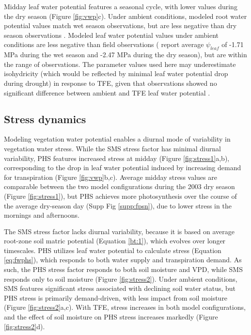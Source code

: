 \documentclass[draft,linenumbers]{agujournal}
\begin{document}
    Midday leaf water potential features a seasonal cycle, with lower values during the dry season (Figure \ref{fig:vwp}c).
    Under ambient conditions, modeled root water potential values match wet season observations, but are less negative than dry season observations \citep{fisher2006}.
    Modeled leaf water potential values under ambient conditions are less negative than field observations (\cite{fisher2006} report average $\psi_{leaf}$ of -1.71 MPa during the wet season and -2.47 MPa during the dry season), 
    but are within the range of observations.
    The parameter values used here may underestimate isohydricity (which would be reflected by minimal leaf water potential drop during drought) in response to TFE, given that observations showed no significant difference between ambient and TFE leaf water potential \citep{fisher2006}. 

\subsection{Stress dynamics}
    
    Modeling vegetation water potential enables a diurnal mode of variability in vegetation water stress.
    While the SMS stress factor has minimal diurnal variability,
    PHS features increased stress at midday (Figure \ref{fig:stress1}a,b), corresponding to the drop in leaf water potential induced by increasing demand for transpiration (Figure \ref{fig:vwp}b,c).
    Average midday stress values are comparable between the two model configurations during the 2003 dry season (Figure \ref{fig:stress1}), 
    but PHS achieves more photosynthesis over the course of the average dry-season day (Supp Fig \ref{supp:fpsn}), due to lower stress in the mornings and afternoons.
    
    The SMS stress factor lacks diurnal variability, because it is based on average root-zone soil matric potential (Equation \ref{bt:1}), which evolves over longer timescales.
    PHS utilizes leaf water potential to calculate stress (Equation \ref{eq:fwphs}), which responds to both water supply and transpiration demand.
    As such, the PHS stress factor responds to both soil moisture and VPD, while SMS responds only to soil moisture (Figure \ref{fig:stress2}).
    Under ambient conditions, SMS features significant stress associated with declining soil water status, but PHS stress is primarily demand-driven, with less impact from soil moisture (Figure \ref{fig:stress2}a,c).
    With TFE, stress increases in both model configurations, and the effect of soil moisture on PHS stress increases markedly (Figure \ref{fig:stress2}d).
\end{document}
